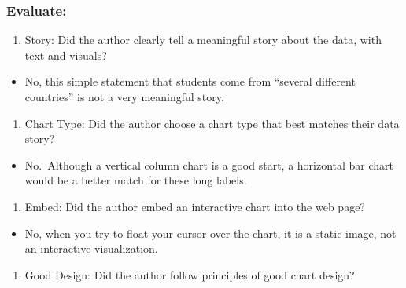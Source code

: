 \documentclass[
  english,
]{book}
\providecommand{\tightlist}{%
  \setlength{\itemsep}{0pt}\setlength{\parskip}{0pt}}
\begin{document}
\hypertarget{evaluate-1}{%
\subsubsection{Evaluate:}\label{evaluate-1}}

\begin{enumerate}
\def\labelenumi{\arabic{enumi}.}
\tightlist
\item
  Story: Did the author clearly tell a meaningful story about the data, with text and visuals?
\end{enumerate}

\begin{itemize}
\tightlist
\item
  No, this simple statement that students come from ``several different countries'' is not a very meaningful story.
\end{itemize}

\begin{enumerate}
\def\labelenumi{\arabic{enumi}.}
\setcounter{enumi}{1}
\tightlist
\item
  Chart Type: Did the author choose a chart type that best matches their data story?
\end{enumerate}

\begin{itemize}
\tightlist
\item
  No.~Although a vertical column chart is a good start, a horizontal bar chart would be a better match for these long labels.
\end{itemize}

\begin{enumerate}
\def\labelenumi{\arabic{enumi}.}
\setcounter{enumi}{2}
\tightlist
\item
  Embed: Did the author embed an interactive chart into the web page?
\end{enumerate}

\begin{itemize}
\tightlist
\item
  No, when you try to float your cursor over the chart, it is a static image, not an interactive visualization.
\end{itemize}

\begin{enumerate}
\def\labelenumi{\arabic{enumi}.}
\setcounter{enumi}{3}
\tightlist
\item
  Good Design: Did the author follow principles of good chart design?
\end{enumerate}
\end{document}
